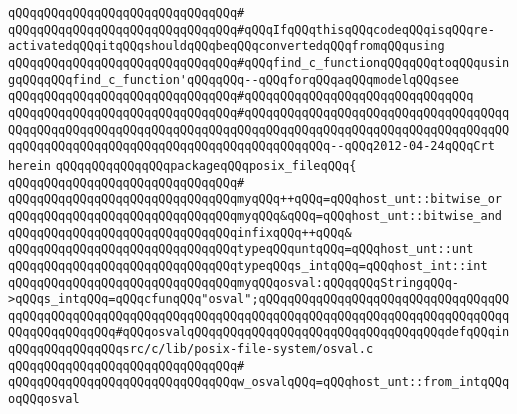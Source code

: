 \verb|qQQqqQQqqQQqqQQqqQQqqQQqqQQqqQQq#|\newline
\verb|qQQqqQQqqQQqqQQqqQQqqQQqqQQqqQQq#qQQqIfqQQqthisqQQqcodeqQQqisqQQqre-activatedqQQqitqQQqshouldqQQqbeqQQqconvertedqQQqfromqQQqusing|\newline
\verb|qQQqqQQqqQQqqQQqqQQqqQQqqQQqqQQq#qQQqfind_c_functionqQQqqQQqtoqQQqusingqQQqqQQqfind_c_function'qQQqqQQq--qQQqforqQQqaqQQqmodelqQQqsee|\newline
\verb|qQQqqQQqqQQqqQQqqQQqqQQqqQQqqQQq#qQQqqQQqqQQqqQQqqQQq|\verb|qQQqqQQqqQQq|\newline
\verb|qQQqqQQqqQQqqQQqqQQqqQQqqQQqqQQq#qQQqqQQqqQQqqQQqqQQqqQQqqQQqqQQqqQQqqQQqqQQqqQQqqQQqqQQqqQQqqQQqqQQqqQQqqQQqqQQqqQQqqQQqqQQqqQQqqQQqqQQqqQQqqQQqqQQqqQQqqQQqqQQqqQQqqQQqqQQqqQQqqQQqqQQq--qQQq2012-04-24qQQqCrt|\newline
\verb|herein|\newline
\newline
\verb|qQQqqQQqqQQqqQQqpackageqQQqposix_fileqQQq{|\newline
\verb|qQQqqQQqqQQqqQQqqQQqqQQqqQQqqQQq#|\newline
\verb|qQQqqQQqqQQqqQQqqQQqqQQqqQQqqQQqmyqQQq++qQQq=qQQqhost_unt::bitwise_or|\newline
\verb|qQQqqQQqqQQqqQQqqQQqqQQqqQQqqQQqmyqQQq&qQQq=qQQqhost_unt::bitwise_and|\newline
\verb|qQQqqQQqqQQqqQQqqQQqqQQqqQQqqQQqinfixqQQq++qQQq&|\newline
\newline
\verb|qQQqqQQqqQQqqQQqqQQqqQQqqQQqqQQqtypeqQQquntqQQq=qQQqhost_unt::unt|\newline
\verb|qQQqqQQqqQQqqQQqqQQqqQQqqQQqqQQqtypeqQQqs_intqQQq=qQQqhost_int::int|\newline
\newline
\newline
\verb|qQQqqQQqqQQqqQQqqQQqqQQqqQQqqQQqmyqQQqosval:qQQqqQQqStringqQQq->qQQqs_intqQQq=qQQqcfunqQQq"osval";qQQqqQQqqQQqqQQqqQQqqQQqqQQqqQQqqQQqqQQqqQQqqQQqqQQqqQQqqQQqqQQqqQQqqQQqqQQqqQQqqQQqqQQqqQQqqQQqqQQqqQQqqQQqqQQqqQQqqQQq#qQQqosvalqQQqqQQqqQQqqQQqqQQqqQQqqQQqqQQqqQQqdefqQQqinqQQqqQQqqQQqqQQqsrc/c/lib/posix-file-system/osval.c|\newline
\verb|qQQqqQQqqQQqqQQqqQQqqQQqqQQqqQQq#|\newline
\verb|qQQqqQQqqQQqqQQqqQQqqQQqqQQqqQQqw_osvalqQQq=qQQqhost_unt::from_intqQQqoqQQqosval|\newline
\newline
